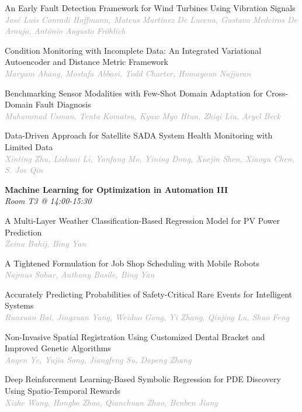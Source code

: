 \begin{multicols*}{2}
\small An Early Fault Detection Framework for Wind Turbines Using Vibration Signals\\ 
\footnotesize \textcolor{darkgray}{\textit{José Luis Conradi Hoffmann, Mateus  Martínez De Lucena, Gustavo  Medeiros De Araujo, Antônio Augusto  Fröhlich}}

\small Condition Monitoring with Incomplete Data: An Integrated Variational Autoencoder and Distance Metric Framework\\ 
\footnotesize \textcolor{darkgray}{\textit{Maryam Ahang, Mostafa  Abbasi, Todd  Charter, Homayoun  Najjaran}}

\small Benchmarking Sensor Modalities with Few-Shot Domain Adaptation for Cross-Domain Fault Diagnosis\\ 
\footnotesize \textcolor{darkgray}{\textit{Muhammad Usman, Tenta  Komatsu, Kyaw Myo  Htun, Zhiqi  Liu, Aryel  Beck}}

\small Data-Driven Approach for Satellite SADA System Health Monitoring with Limited Data\\ 
\footnotesize \textcolor{darkgray}{\textit{Xinting Zhu, Lishuai  Li, Yanfang  Mo, Yining  Dong, Xuejin  Shen, Xiaoyu  Chen, S. Joe  Qin}}

\normalsize \textbf{Machine Learning for Optimization in Automation III}\\
\small \textit{Room T3 @ 14:00-15:30}

\small A Multi-Layer Weather Classification-Based Regression Model for PV Power Prediction\\ 
\footnotesize \textcolor{darkgray}{\textit{Zeina Bahij, Bing  Yan}}

\small A Tightened Formulation for Job Shop Scheduling with Mobile Robots\\ 
\footnotesize \textcolor{darkgray}{\textit{Najmus Sahar, Anthony  Basile, Bing  Yan}}

\small Accurately Predicting Probabilities of Safety-Critical Rare Events for Intelligent Systems\\ 
\footnotesize \textcolor{darkgray}{\textit{Ruoxuan Bai, Jingxuan  Yang, Weiduo  Gong, Yi  Zhang, Qiujing  Lu, Shuo  Feng}}

\small Non-Invasive Spatial Registration Using Customized Dental Bracket and Improved Genetic Algorithms\\ 
\footnotesize \textcolor{darkgray}{\textit{Angen Ye, Yujia  Song, Jiangfeng  Su, Dapeng  Zhang}}

\small Deep Reinforcement Learning-Based Symbolic Regression for PDE Discovery Using Spatio-Temporal Rewards\\ 
\footnotesize \textcolor{darkgray}{\textit{Xizhe Wang, Hongbo  Zhao, Qianchuan  Zhao, Benben  Jiang}}


\end{multicols*}
